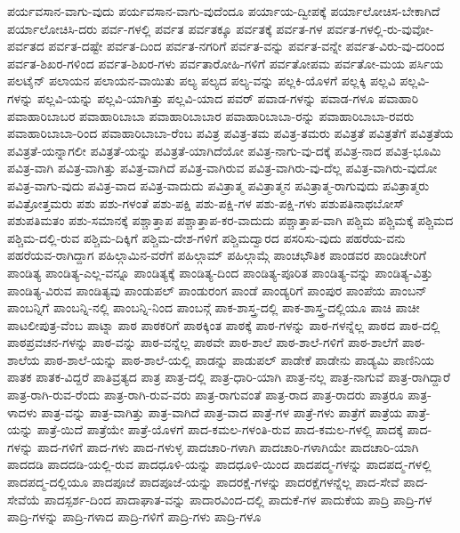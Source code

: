 {ಪರ್ಯವಸಾನ-ವಾಗು-ವುದು
ಪರ್ಯವಸಾನ-ವಾಗು-ವುದೆಂದೂ
ಪರ್ಯಾಯ-ದ್ವೀಪಕ್ಕೆ
ಪರ್ಯಾಲೋಚಿಸ-ಬೇಕಾಗಿದೆ
ಪರ್ಯಾಲೋಚಿಸಿ-ದರು
ಪರ್ವ-ಗಳಲ್ಲಿ
ಪರ್ವತ
ಪರ್ವತಕ್ಕೂ
ಪರ್ವತಕ್ಕೆ
ಪರ್ವತ-ಗಳ
ಪರ್ವತ-ಗಳಲ್ಲಿ-ರು-ವುವೋ-
ಪರ್ವತದ
ಪರ್ವತ-ದಷ್ಟೇ
ಪರ್ವತ-ದಿಂದ
ಪರ್ವತ-ನಗರಿಗೆ
ಪರ್ವತ-ವನ್ನು
ಪರ್ವತ-ವನ್ನೇ
ಪರ್ವತ-ವಿರು-ವು-ದರಿಂದ
ಪರ್ವತ-ಶಿಖರ-ಗಳಿಂದ
ಪರ್ವತ-ಶಿಖರ-ಗಳು
ಪರ್ವತಾರೋಹಿ-ಗಳಿಗೆ
ಪರ್ವತೋಪಮ
ಪರ್ವತೋ-ಮಯ
ಪರ್ಸಿಯ
ಪಲಟೈನ್
ಪಲಾಯನ
ಪಲಾಯನ-ವಾಯಿತು
ಪಲ್ಯ
ಪಲ್ಯದ
ಪಲ್ಯ-ವನ್ನು
ಪಲ್ಲಕಿ-ಯೊಳಗೆ
ಪಲ್ಲಕ್ಕಿ
ಪಲ್ಲವಿ
ಪಲ್ಲವಿ-ಗಳನ್ನು
ಪಲ್ಲವಿ-ಯನ್ನು
ಪಲ್ಲವಿ-ಯಾಗಿತ್ತು
ಪಲ್ಲವಿ-ಯಾದ
ಪವರ್
ಪವಾಡ-ಗಳನ್ನು
ಪವಾಡ-ಗಳೂ
ಪವಾಹಾರಿ
ಪವಾಹಾರಿಬಾಬರ
ಪವಾಹಾರಿಬಾಬಾ
ಪವಾಹಾರಿಬಾಬಾರ
ಪವಾಹಾರಿಬಾಬಾ-ರನ್ನು
ಪವಾಹಾರಿಬಾಬಾ-ರವರು
ಪವಾಹಾರಿಬಾಬಾ-ರಿಂದ
ಪವಾಹಾರಿಬಾಬಾ-ರೆಂಬ
ಪವಿತ್ರ
ಪವಿತ್ರ-ತಮ
ಪವಿತ್ರ-ತಮರು
ಪವಿತ್ರತೆ
ಪವಿತ್ರತೆಗೆ
ಪವಿತ್ರತೆಯ
ಪವಿತ್ರತೆ-ಯನ್ನಾಗಲೀ
ಪವಿತ್ರತೆ-ಯನ್ನು
ಪವಿತ್ರತೆ-ಯಾಗಿದೆಯೋ
ಪವಿತ್ರ-ನಾಗು-ವು-ದಕ್ಕೆ
ಪವಿತ್ರ-ನಾದ
ಪವಿತ್ರ-ಭೂಮಿ
ಪವಿತ್ರ-ವಾಗಿ
ಪವಿತ್ರ-ವಾಗಿತ್ತು
ಪವಿತ್ರ-ವಾಗಿದೆ
ಪವಿತ್ರ-ವಾಗಿರುವ
ಪವಿತ್ರ-ವಾಗಿರು-ವು-ದೆಲ್ಲ
ಪವಿತ್ರ-ವಾಗಿರು-ವುದೋ
ಪವಿತ್ರ-ವಾಗು-ವುದು
ಪವಿತ್ರ-ವಾದ
ಪವಿತ್ರ-ವಾದುದು
ಪವಿತ್ರಾತ್ಮ
ಪವಿತ್ರಾತ್ಮನ
ಪವಿತ್ರಾತ್ಮ-ರಾಗುವುದು
ಪವಿತ್ರಾತ್ಮರು
ಪವಿತ್ರೋತ್ತಮರು
ಪಶು
ಪಶು-ಗಳಂತೆ
ಪಶು-ಪಕ್ಷಿ
ಪಶು-ಪಕ್ಷಿ-ಗಳ
ಪಶು-ಪಕ್ಷಿ-ಗಳು
ಪಶುಪತಿನಾಥಬೋಸ್
ಪಶುಪತಿಮತಂ
ಪಶು-ಸಮಾನಕ್ಕೆ
ಪಶ್ಚಾತ್ತಾಪ
ಪಶ್ಚಾತ್ತಾಪ-ಕರ-ವಾದುದು
ಪಶ್ಚಾತ್ತಾಪ-ವಾಗಿ
ಪಶ್ಚಿಮ
ಪಶ್ಚಿಮಕ್ಕೆ
ಪಶ್ಚಿಮದ
ಪಶ್ಚಿಮ-ದಲ್ಲಿ-ರುವ
ಪಶ್ಚಿಮ-ದಿಕ್ಕಿಗೆ
ಪಶ್ಚಿಮ-ದೇಶ-ಗಳಿಗೆ
ಪಶ್ಚಿಮದ್ವಾರದ
ಪಸರಿಸು-ವುದು
ಪಹರೆಯ-ವನು
ಪಹರೆಯವ-ರಾಗಿದ್ದಾಗ
ಪಹಿಲ್ಗಾಮಿನ-ವರೆಗೆ
ಪಹಿಲ್ಗಾಮ್
ಪಹಿಲ್ಗಾಮ್ಗೆ
ಪಾಂಚಭೌತಿಕ
ಪಾಂಡವರ
ಪಾಂಡಿಚೇರಿಗೆ
ಪಾಂಡಿತ್ಯ
ಪಾಂಡಿತ್ಯ-ಎಲ್ಲ-ವನ್ನೂ
ಪಾಂಡಿತ್ಯಕ್ಕೆ
ಪಾಂಡಿತ್ಯ-ದಿಂದ
ಪಾಂಡಿತ್ಯ-ಪೂರಿತ
ಪಾಂಡಿತ್ಯ-ವನ್ನು
ಪಾಂಡಿತ್ಯ-ವಿತ್ತು
ಪಾಂಡಿತ್ಯ-ವಿರುವ
ಪಾಂಡಿತ್ಯವು
ಪಾಂಡುಪಲ್
ಪಾಂಡುರಂಗ
ಪಾಂಡೆ
ಪಾಂಡ್ಯರಿಗೆ
ಪಾಂಪುರ
ಪಾಂಪೆಯ
ಪಾಂಬನ್
ಪಾಂಬನ್ನಿಗೆ
ಪಾಂಬನ್ನಿ-ನಲ್ಲಿ
ಪಾಂಬನ್ನಿ-ನಿಂದ
ಪಾಂಬನ್ಗೆ
ಪಾಕ-ಶಾಸ್ತ್ರ-ದಲ್ಲಿ
ಪಾಕ-ಶಾಸ್ತ್ರ-ದಲ್ಲಿಯೂ
ಪಾಚಿ
ಪಾಚೀ
ಪಾಟಲೀಪುತ್ರ-ವೆಂಬ
ಪಾಟ್ನಾ
ಪಾಠ
ಪಾಠಕರಿಗೆ
ಪಾಠಕ್ಕಿಂತ
ಪಾಠಕ್ಕೆ
ಪಾಠ-ಗಳನ್ನು
ಪಾಠ-ಗಳನ್ನೆಲ್ಲ
ಪಾಠದ
ಪಾಠ-ದಲ್ಲಿ
ಪಾಠಪ್ರವಚನ-ಗಳನ್ನು
ಪಾಠ-ವನ್ನು
ಪಾಠ-ವನ್ನೆಲ್ಲ
ಪಾಠವೇ
ಪಾಠ-ಶಾಲೆ
ಪಾಠ-ಶಾಲೆ-ಗಳಿಗೆ
ಪಾಠ-ಶಾಲೆಗೆ
ಪಾಠ-ಶಾಲೆಯ
ಪಾಠ-ಶಾಲೆ-ಯನ್ನು
ಪಾಠ-ಶಾಲೆ-ಯಲ್ಲಿ
ಪಾಡನ್ನು
ಪಾಡುಪಲ್
ಪಾಡೇಕೆ
ಪಾಡೇನು
ಪಾಡ್ಯಮಿ
ಪಾಣಿನಿಯ
ಪಾತಕ
ಪಾತಕ-ವಿದ್ದರೆ
ಪಾತಿವ್ರತ್ಯದ
ಪಾತ್ರ
ಪಾತ್ರ-ದಲ್ಲಿ
ಪಾತ್ರ-ಧಾರಿ-ಯಾಗಿ
ಪಾತ್ರ-ನಲ್ಲ
ಪಾತ್ರ-ನಾಗುವೆ
ಪಾತ್ರ-ರಾಗಿದ್ದಾರೆ
ಪಾತ್ರ-ರಾಗಿ-ರುವ-ರೆಂದು
ಪಾತ್ರ-ರಾಗಿ-ರುವ-ವರು
ಪಾತ್ರ-ರಾಗುವಂತೆ
ಪಾತ್ರ-ರಾದ
ಪಾತ್ರ-ರಾದರು
ಪಾತ್ರರೂ
ಪಾತ್ರ-ಳಾದಳು
ಪಾತ್ರ-ವನ್ನು
ಪಾತ್ರ-ವಾಗಿತ್ತು
ಪಾತ್ರ-ವಾಗಿದೆ
ಪಾತ್ರ-ವಾದ
ಪಾತ್ರೆ-ಗಳ
ಪಾತ್ರೆ-ಗಳು
ಪಾತ್ರೆಗೆ
ಪಾತ್ರೆಯ
ಪಾತ್ರೆ-ಯನ್ನು
ಪಾತ್ರೆ-ಯಿದೆ
ಪಾತ್ರೆಯೇ
ಪಾತ್ರೆ-ಯೊಳಗೆ
ಪಾದ-ಕಮಲ-ಗಳಂತಿ-ರುವ
ಪಾದ-ಕಮಲ-ಗಳಲ್ಲಿ
ಪಾದಕ್ಕೆ
ಪಾದ-ಗಳನ್ನು
ಪಾದ-ಗಳಿಗೆ
ಪಾದ-ಗಳು
ಪಾದ-ಗಳುಳ್ಳ
ಪಾದಚಾರಿ-ಗಳಾಗಿ
ಪಾದಚಾರಿ-ಗಳಾಗಿಯೇ
ಪಾದಚಾರಿ-ಯಾಗಿ
ಪಾದದಡಿ
ಪಾದದಡಿ-ಯಲ್ಲಿ-ರುವ
ಪಾದಧೂಳಿ-ಯನ್ನು
ಪಾದಧೂಳಿ-ಯಿಂದ
ಪಾದಪದ್ಮ-ಗಳನ್ನು
ಪಾದಪದ್ಮ-ಗಳಲ್ಲಿ
ಪಾದಪದ್ಮ-ದಲ್ಲಿಯೂ
ಪಾದಪೂಜೆ
ಪಾದಪೂಜೆ-ಯನ್ನು
ಪಾದರಕ್ಷೆ-ಗಳನ್ನು
ಪಾದರಕ್ಷೆಗಳನ್ನೆಲ್ಲ
ಪಾದ-ಸೇವೆ
ಪಾದ-ಸೇವೆಯೆ
ಪಾದಸ್ಪರ್ಶ-ದಿಂದ
ಪಾದಾಘಾತ-ವನ್ನು
ಪಾದಾರವಿಂದ-ದಲ್ಲಿ
ಪಾದುಕೆ-ಗಳ
ಪಾದುಕೆಯ
ಪಾದ್ರಿ
ಪಾದ್ರಿ-ಗಳ
ಪಾದ್ರಿ-ಗಳನ್ನು
ಪಾದ್ರಿ-ಗಳಾದ
ಪಾದ್ರಿ-ಗಳಿಗೆ
ಪಾದ್ರಿ-ಗಳು
ಪಾದ್ರಿ-ಗಳೂ
}
